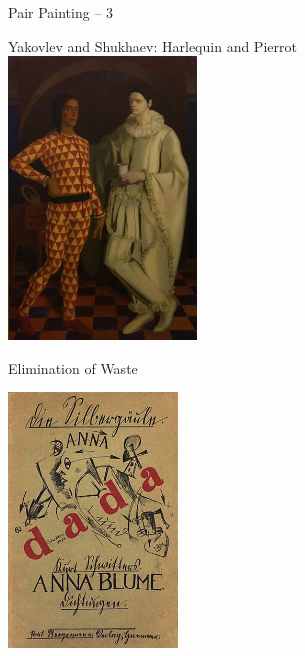 \documentclass{beamer}
\begin{document}
\begin{frame}
{\centerline{Pair Painting -- 3}}

\begin{center}
Yakovlev and Shukhaev: Harlequin and Pierrot\\ 
\vspace{0.3cm}
\includegraphics[width=5cm]{P2023.AIBCCSS.Drawing/yakovlev.jpeg}
\end{center}

\end{frame}

\begin{frame}
{\centerline{Elimination of Waste}}

\begin{center}
\includegraphics[width=4.5cm]{P2023.AIBCCSS.Drawing/An_Anna_Blume.jpg}
\end{center}

\end{frame}
\end{document}
